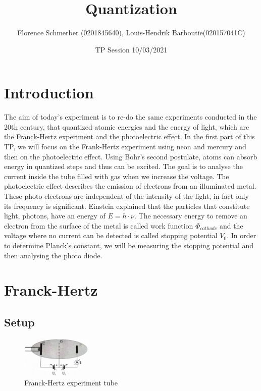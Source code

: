 \documentclass{scrartcl}
\title{Quantization}
\date{TP Session 10/03/2021}
\author{Florence Schmerber (0201845640),
Louis-Hendrik Barboutie(020157041C)}
\begin{document}
\maketitle

\clearpage

\tableofcontents

\listoffigures
	
\clearpage

\section{Introduction}
The aim of today's experiment is to re-do the same experiments conducted in the 20th century, that quantized atomic energies and the energy of light, which are the Franck-Hertz experiment and the photoelectric effect. In the first part of this TP, we will focus on the Frank-Hertz experiment using neon and mercury and then on the photoelectric effect. Using Bohr's second postulate, atoms can absorb energy in quantized steps and thus can be excited. The goal is to analyse the current inside the tube filled with gas when we increase the voltage. 
\newline 
The photoelectric effect describes the emission of electrons from an illuminated metal. These photo electrons are independent of the intensity of the light, in fact only its frequency is significant. Einstein explained that the particles that constitute light, photons, have an energy of $E = h \cdot \nu$. The necessary energy to remove an electron from the surface of the metal is called work function $\Phi_{cathode}$ and the voltage where no current can be detected is called stopping potential $V_0$. In order to determine Planck's constant, we will be measuring the stopping potential and then analysing the photo diode.

\section{Franck-Hertz}

\subsection{Setup}

\begin{figure}
\centering
    \includegraphics[width=0.3\textwidth]{Franck_2.jpg}
    \caption{Franck-Hertz experiment tube}
\end{figure}
\end{document}
